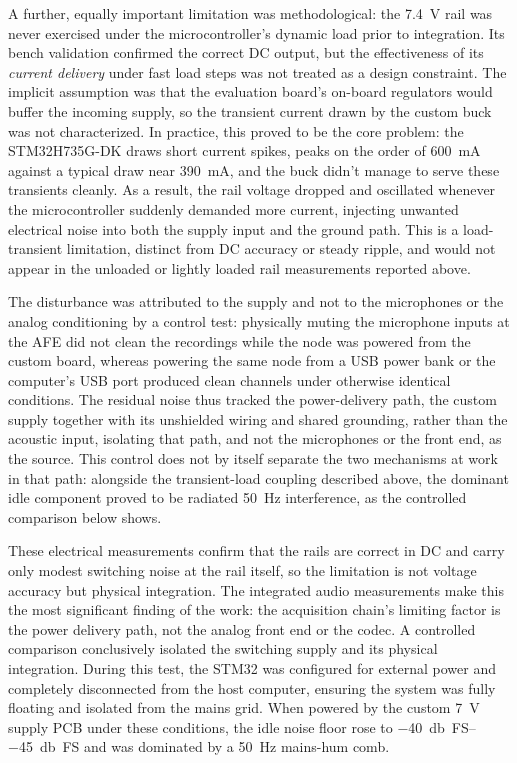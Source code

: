 A further, equally important limitation was methodological: the \SI{7.4}{\volt} rail was never exercised under the microcontroller's dynamic load prior to integration. Its bench validation confirmed the correct DC output, but the effectiveness of its \emph{current delivery} under fast load steps was not treated as a design constraint. The implicit assumption was that the evaluation board's on-board regulators would buffer the incoming supply, so the transient current drawn by the custom buck was not characterized. In practice, this proved to be the core problem: the STM32H735G-DK draws short current spikes, peaks on the order of \SI{600}{\milli\ampere} against a typical draw near \SI{390}{\milli\ampere}, and the buck didn’t manage to serve these transients cleanly. As a result, the rail voltage dropped and oscillated whenever the microcontroller suddenly demanded more current, injecting unwanted electrical noise into both the supply input and the ground path. This is a load-transient limitation, distinct from DC accuracy or steady ripple, and would not appear in the unloaded or lightly loaded rail measurements reported above.

The disturbance was attributed to the supply and not to the microphones or the analog conditioning by a control test: physically muting the microphone inputs at the AFE did not clean the recordings while the node was powered from the custom board, whereas powering the same node from a USB power bank or the computer's USB port produced clean channels under otherwise identical conditions. The residual noise thus tracked the power-delivery path, the custom supply together with its unshielded wiring and shared grounding, rather than the acoustic input, isolating that path, and not the microphones or the front end, as the source. This control does not by itself separate the two mechanisms at work in that path: alongside the transient-load coupling described above, the dominant idle component proved to be radiated \SI{50}{\hertz} interference, as the controlled comparison below shows.

These electrical measurements confirm that the rails are correct in DC and carry only modest switching noise at the rail itself, so the limitation is not voltage accuracy but physical integration. The integrated audio measurements make this the most significant finding of the work: the acquisition chain's limiting factor is the power delivery path, not the analog front end or the codec. A controlled comparison conclusively isolated the switching supply and its physical integration. During this test, the STM32 was configured for external power and completely disconnected from the host computer, ensuring the system was fully floating and isolated from the mains grid. When powered by the custom \SI{7}{\volt} supply PCB under these conditions, the idle noise floor rose to \SIrange{-40}{-45}{\decibel FS} and was dominated by a \SI{50}{\hertz} mains-hum comb.

